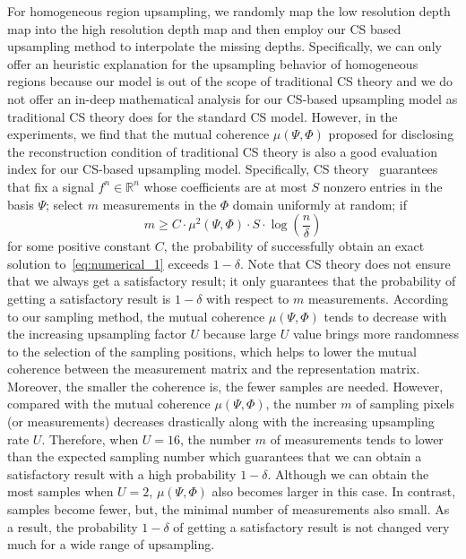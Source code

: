 \documentclass[preprint,10pt,5p,times,twocolumn]{elsarticle}
\begin{document}
For homogeneous region upsampling, we randomly map the low resolution depth map into the high resolution depth map and then employ our CS based upsampling method to interpolate the missing depths. Specifically, we can only offer an heuristic explanation for the upsampling behavior of homogeneous regions because our model is out of the scope of traditional CS theory and we do not offer an in-deep mathematical analysis for our CS-based upsampling model as traditional CS theory does for the standard CS model. However, in the experiments, we find that the mutual coherence $\mu(\Psi, \Phi)$ proposed for disclosing the reconstruction condition of traditional CS theory is also a good evaluation index for our CS-based upsampling model. Specifically, CS theory~\cite{CW08} guarantees that fix a signal $f^n \in \mathbb{R}^n$ whose coefficients are at most $S$ nonzero entries in the basis $\Psi$; select $m$ measurements in the $\Phi$ domain uniformly at random; if
\begin{equation}
m \geq C \cdot \mu^2(\Psi, \Phi) \cdot S \cdot \log(\frac{n}{\delta})
\end{equation}
for some positive constant $C$, the probability of successfully obtain an exact solution to~\eqref{eq:numerical_1} exceeds $1 - \delta$. Note that CS theory does not ensure that we always get a satisfactory result; it only guarantees that the probability of getting a satisfactory result is $1-\delta$ with respect to $m$ measurements. According to our sampling method, the mutual coherence $\mu(\Psi, \Phi)$ tends to decrease with the increasing upsampling factor $U$ because large $U$ value brings more randomness to the selection of the sampling positions, which helps to lower the mutual coherence between the measurement matrix and the representation matrix. Moreover, the smaller the coherence is, the fewer samples are needed. However, compared with the mutual coherence $\mu(\Psi, \Phi)$, the number $m$ of sampling pixels (or measurements) decreases drastically along with the increasing upsampling rate $U$. Therefore, when $U = 16$, the number $m$ of measurements tends to lower than the expected sampling number which guarantees that we can obtain a satisfactory result with a high probability $1-\delta$. Although we can obtain the most samples when $U=2$, $\mu(\Psi, \Phi)$ also becomes larger in this case. In contrast, samples become fewer, but, the minimal number of measurements also small. As a result, the probability $1-\delta$ of getting a satisfactory result is not changed very much for a wide range of upsampling.
\end{document}
